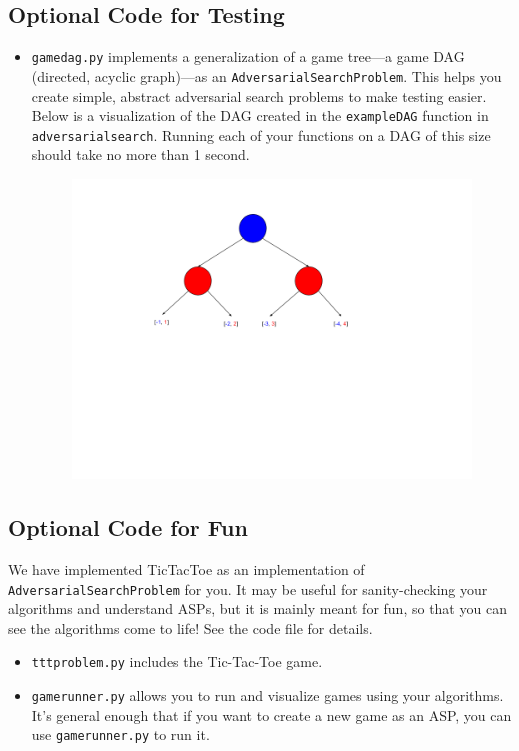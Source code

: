 \documentclass{article}
\begin{document}
\subsection{Optional Code for Testing}
\begin{itemize}
    \item \verb|gamedag.py| implements a generalization of a game tree---a game DAG (directed, acyclic graph)---as an \verb|AdversarialSearchProblem|.
    This helps you create simple, abstract adversarial search problems to make testing easier. Below is a visualization of the DAG created in the \verb|exampleDAG| function in \verb|adversarialsearch|. Running each of your functions on a DAG of this size should take no more than 1 second.
\begin{figure}[h]
\includegraphics[scale = 0.4]{example-DAG.png}
\centering
\end{figure}
\end{itemize}


\subsection{Optional Code for Fun}
We have implemented TicTacToe as an implementation of \verb|AdversarialSearchProblem| for you.
It may be useful for sanity-checking your algorithms and understand ASPs, but it is mainly meant for fun, so that you can see
the algorithms come to life!
See the code file for details.
\begin{itemize}
\item \verb|tttproblem.py| includes the Tic-Tac-Toe game.
\item \verb|gamerunner.py| allows you to run and visualize games using your algorithms.
It's general enough that if you want to create a new game as an ASP, you can use \verb|gamerunner.py| to run it.
\end{itemize}
\end{document}
